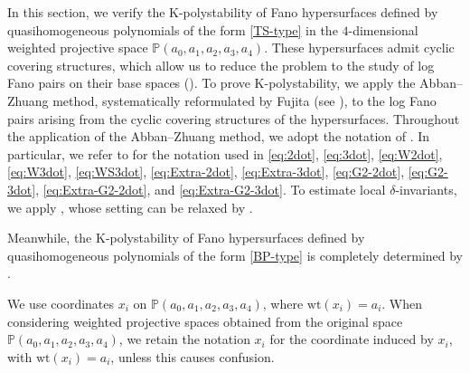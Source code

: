 \documentclass[12pt]{amsart}
\theoremstyle{definition}
\theoremstyle{remark}
\begin{document}
In this section, we verify the K-polystability of Fano hypersurfaces defined by quasihomogeneous polynomials of the form \eqref{TS-type} in the $4$-dimensional weighted projective space $\mathbb{P}(a_0,a_1,a_2,a_3,a_4)$.
These hypersurfaces admit cyclic covering structures, which allow us to reduce the problem to the study of log Fano pairs on their base spaces (\cite[Theorem~1.2]{LZ22}).
To prove K-polystability, we apply the Abban--Zhuang method, systematically reformulated by Fujita (see \cite{book,Fu23}), to the log Fano pairs arising from the cyclic covering structures of the hypersurfaces. Throughout the application of the Abban--Zhuang method, we adopt the notation of \cite{Fu23}. In particular, we refer to \cite[Theorems~4.8 and~4.17]{Fu23} for the notation used in \eqref{eq:2dot}, \eqref{eq:3dot}, \eqref{eq:W2dot}, \eqref{eq:W3dot}, \eqref{eq:WS3dot}, \eqref{eq:Extra-2dot}, \eqref{eq:Extra-3dot}, \eqref{eq:G2-2dot}, \eqref{eq:G2-3dot}, \eqref{eq:Extra-G2-2dot}, and \eqref{eq:Extra-G2-3dot}.
To estimate  local $\delta$-invariants, we apply
 \cite[Corollary~4.8]{Fu23}, whose setting can be relaxed by \cite[Theorem~11.14]{Fu23}.

Meanwhile, the K-polystability of Fano hypersurfaces defined by quasihomogeneous polynomials of the form \eqref{BP-type} is completely determined by \cite[Theorem~1.4]{LST25}.

We use coordinates $x_i$ on $\mathbb{P}(a_0,a_1,a_2,a_3,a_4)$, where $\mathrm{wt}(x_i)=a_i$. When considering weighted projective spaces obtained from the original space $\mathbb{P}(a_0,a_1,a_2,a_3,a_4)$, we retain the notation $x_i$ for the coordinate induced by $x_i$, with $\mathrm{wt}(x_i)=a_i$, unless this causes confusion.
\end{document}

